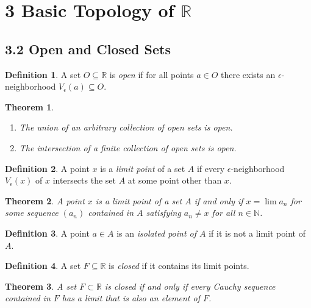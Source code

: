\documentclass{amsart}
\newtheorem*{theorem}{Theorem}
\theoremstyle{definition}
\newtheorem*{definition}{Definition}
\newcommand{\N}{\mathbb{N}}
\newcommand{\R}{\mathbb{R}}
\begin{document}
\section*{3 Basic Topology of $\R$}

\subsection*{3.2 Open and Closed Sets}

\begin{definition}
  A set $O \subseteq \R$ is \emph{open} if for all points $a \in O$ there exists
  an $\epsilon$-neighborhood $V_\epsilon(a) \subseteq O$.
\end{definition}

\begin{theorem}
  \begin{enumerate}[label={(\roman*)}]
    \item The union of an arbitrary collection of open sets is open.
    \item The intersection of a finite collection of open sets is open.
  \end{enumerate}
\end{theorem}

\begin{definition}
  A point $x$ is a \emph{limit point} of a set $A$ if every
  $\epsilon$-neighborhood $V_\epsilon(x)$ of $x$ intersects the set $A$ at some
  point other than $x$.
\end{definition}

\begin{theorem}
  A point $x$ is a limit point of a set $A$ if and only if $x = \lim a_n$ for
  some sequence $(a_n)$ contained in $A$ satisfying $a_n \neq x$ for all $n \in
  \N$.
\end{theorem}

\begin{definition}
  A point $a \in A$ is an \emph{isolated point of $A$} if it is not a limit
  point of $A$.
\end{definition}

\begin{definition}
  A set $F \subseteq \R$ is \emph{closed} if it contains its limit points.
\end{definition}

\begin{theorem}
  A set $F \subset \R$ is closed if and only if every Cauchy sequence contained
  in $F$ has a limit that is also an element of $F$.
\end{theorem}
\end{document}
